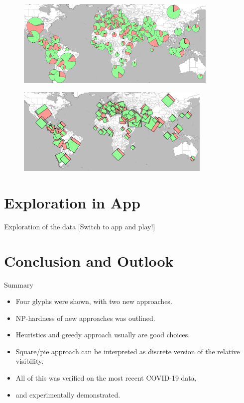 \documentclass{beamer}
\begin{document}
\begin{frame}
\begin{figure}[!b]
  \centering
  \includegraphics[height=4.2cm]{pieChartsEval}
\end{figure}

\begin{figure}[b]
  \centering
  \includegraphics[height=4.2cm]{squaresEval}

\end{figure}


\end{frame}



  \section{Exploration in App}

  \begin{frame}{Exploration of the data}
    [Switch to app and play!]
  \end{frame}

  \section{Conclusion and Outlook}

  \begin{frame}{Summary}

    \begin{itemize}
      \item Four glyphs were shown, with two new approaches.
      \item NP-hardness of new approaches was outlined.
      \item Heuristics and greedy approach usually are good choices.
      \item Square/pie approach can be interpreted as discrete version of the relative visibility.
      \item All of this was verified on the most recent COVID-19 data,
      \item and experimentally demonstrated.
    \end{itemize}
  \end{frame}
\end{document}
